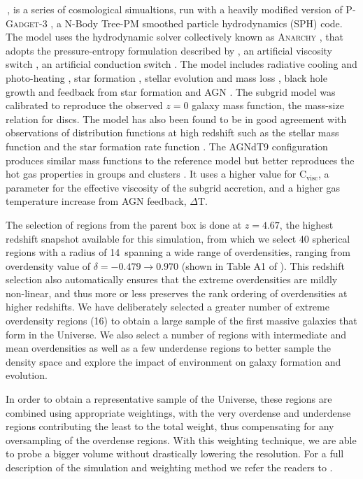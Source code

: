 \eagle\,, is a series of cosmological simualtions, run with a heavily modified version of \textsc{P-Gadget-3} \citep{springel_simulations_2005}, a N-Body Tree-PM smoothed particle hydrodynamics (SPH) code. The model uses the hydrodynamic solver collectively known as \textsc{Anarchy} \citep[described in][]{schaye_eagle_2015,Schaller2015}, that adopts the pressure-entropy formulation described by \cite{Hopkins2013}, an artificial viscosity switch \citep{cullen_inviscid_2010}, an artificial conduction switch \citep[\eg][]{price_modelling_2008}. The model includes radiative cooling and photo-heating \citep{Wiersma2009a}, star formation \citep{Schaye2008}, stellar evolution and mass loss \citep{Wiersma2009b}, black hole growth \citep{springel_simulations_2005} and feedback from star formation and
AGN \citep{DallaVecchia2012}. The subgrid model was calibrated to reproduce the observed $z=0$ galaxy mass function, the mass-size relation for discs. The model has also been found to be in good agreement with observations of distribution functions at high redshift such as the stellar mass function and the star formation rate function \citep{furlong_evolution_2015}. The AGNdT9 configuration produces similar mass functions to the reference model but better reproduces the hot gas properties in groups and clusters \citep{barnes_cluster-eagle_2017}. It uses a higher value for C$_{\text{visc}}$, a parameter for the effective viscosity of the subgrid accretion, and a higher gas temperature increase from AGN feedback, $\Delta$T. 

The selection of regions from the parent box is done at $z=4.67$, the highest redshift snapshot available for this simulation, from which we select 40 spherical regions with a radius of 14\hMpc\, spanning a wide range of overdensities, ranging from overdensity value of $\delta=-0.479\to0.970$ (shown in Table A1 of ). This redshift selection also automatically ensures that the extreme overdensities are mildly non-linear, and thus more or less preserves the rank ordering of overdensities at higher redshifts. We have deliberately selected a greater number of extreme overdensity regions (16) to obtain a large sample of the first massive galaxies that form in the Universe. We also select a number of regions with intermediate and mean overdensities as well as a few underdense regions to better sample the density space and explore the impact of environment on galaxy formation and evolution. 

In order to obtain a representative sample of the Universe, these regions are combined using appropriate weightings, with the very overdense and underdense regions contributing the least to the total weight, thus compensating for any oversampling of the overdense regions. With this weighting technique, we are able to probe a bigger volume without drastically lowering the resolution. For a full description of the simulation and weighting method we refer the readers to .

